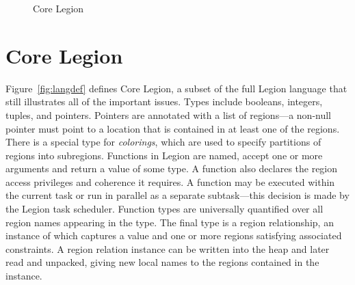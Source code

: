 {\begin{figure*}
{\begin{tabular}{cclr|cclr}
\end{tabular}
}
\caption{Core Legion}
\label{fig:langdeffull}
\vspace{-5mm}
\end{figure*}
}



\section{Core Legion}
\label{sec:legioncorefull}

Figure~\ref{fig:langdef} defines Core Legion, a subset of the full Legion language
that still illustrates all of the important issues.  Types
include booleans, integers, tuples, and pointers.  Pointers
are annotated with a list of regions---a non-null pointer must point to a 
location that is contained in at least one of the regions. There is a special
type for {\em colorings}, which
are used to specify partitions of regions into subregions.
Functions in Legion are named, accept one or more arguments and
return a value of some type.  A function also declares the region
access privileges and coherence it requires.  A function may be executed
within the current task or run in parallel as a separate subtask---this decision is made
by the Legion task scheduler.  Function types are
universally quantified over all region names appearing in the type.
The final type is a region relationship, an instance of which captures a value and
one or more regions satisfying associated constraints.  A region relation instance
can be written into the heap and later read and
unpacked, giving new local names to the regions contained in
the instance.

